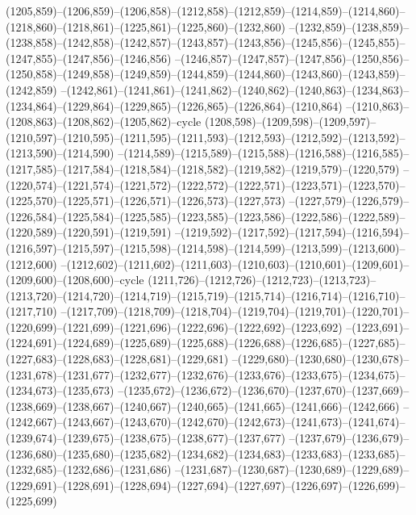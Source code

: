 (1205,859)--(1206,859)--(1206,858)--(1212,858)--(1212,859)--(1214,859)--(1214,860)--(1218,860)--(1218,861)--(1225,861)--(1225,860)--(1232,860)
--(1232,859)--(1238,859)--(1238,858)--(1242,858)--(1242,857)--(1243,857)--(1243,856)--(1245,856)--(1245,855)--(1247,855)--(1247,856)--(1246,856)
--(1246,857)--(1247,857)--(1247,856)--(1250,856)--(1250,858)--(1249,858)--(1249,859)--(1244,859)--(1244,860)--(1243,860)--(1243,859)--(1242,859)
--(1242,861)--(1241,861)--(1241,862)--(1240,862)--(1240,863)--(1234,863)--(1234,864)--(1229,864)--(1229,865)--(1226,865)--(1226,864)--(1210,864)
--(1210,863)--(1208,863)--(1208,862)--(1205,862)--cycle
(1208,598)--(1209,598)--(1209,597)--(1210,597)--(1210,595)--(1211,595)--(1211,593)--(1212,593)--(1212,592)--(1213,592)--(1213,590)--(1214,590)
--(1214,589)--(1215,589)--(1215,588)--(1216,588)--(1216,585)--(1217,585)--(1217,584)--(1218,584)--(1218,582)--(1219,582)--(1219,579)--(1220,579)
--(1220,574)--(1221,574)--(1221,572)--(1222,572)--(1222,571)--(1223,571)--(1223,570)--(1225,570)--(1225,571)--(1226,571)--(1226,573)--(1227,573)
--(1227,579)--(1226,579)--(1226,584)--(1225,584)--(1225,585)--(1223,585)--(1223,586)--(1222,586)--(1222,589)--(1220,589)--(1220,591)--(1219,591)
--(1219,592)--(1217,592)--(1217,594)--(1216,594)--(1216,597)--(1215,597)--(1215,598)--(1214,598)--(1214,599)--(1213,599)--(1213,600)--(1212,600)
--(1212,602)--(1211,602)--(1211,603)--(1210,603)--(1210,601)--(1209,601)--(1209,600)--(1208,600)--cycle
(1211,726)--(1212,726)--(1212,723)--(1213,723)--(1213,720)--(1214,720)--(1214,719)--(1215,719)--(1215,714)--(1216,714)--(1216,710)--(1217,710)
--(1217,709)--(1218,709)--(1218,704)--(1219,704)--(1219,701)--(1220,701)--(1220,699)--(1221,699)--(1221,696)--(1222,696)--(1222,692)--(1223,692)
--(1223,691)--(1224,691)--(1224,689)--(1225,689)--(1225,688)--(1226,688)--(1226,685)--(1227,685)--(1227,683)--(1228,683)--(1228,681)--(1229,681)
--(1229,680)--(1230,680)--(1230,678)--(1231,678)--(1231,677)--(1232,677)--(1232,676)--(1233,676)--(1233,675)--(1234,675)--(1234,673)--(1235,673)
--(1235,672)--(1236,672)--(1236,670)--(1237,670)--(1237,669)--(1238,669)--(1238,667)--(1240,667)--(1240,665)--(1241,665)--(1241,666)--(1242,666)
--(1242,667)--(1243,667)--(1243,670)--(1242,670)--(1242,673)--(1241,673)--(1241,674)--(1239,674)--(1239,675)--(1238,675)--(1238,677)--(1237,677)
--(1237,679)--(1236,679)--(1236,680)--(1235,680)--(1235,682)--(1234,682)--(1234,683)--(1233,683)--(1233,685)--(1232,685)--(1232,686)--(1231,686)
--(1231,687)--(1230,687)--(1230,689)--(1229,689)--(1229,691)--(1228,691)--(1228,694)--(1227,694)--(1227,697)--(1226,697)--(1226,699)--(1225,699)
